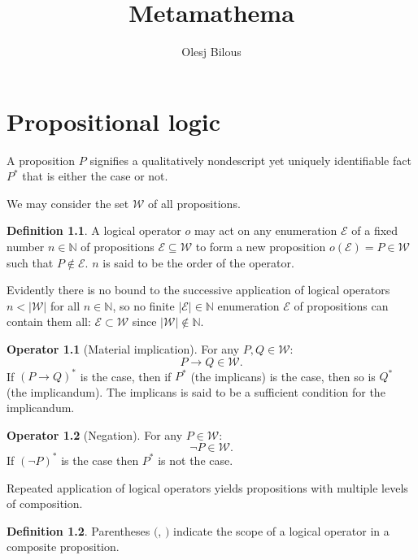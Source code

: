 \documentclass{amsbook}
\newcommand{\wffs}{\mathcal W}
\theoremstyle{definition}
\newtheorem{op}{Operator}[section]
\newtheorem{dfn}{Definition}[section]
\begin{document}
\title{Metamathema}
\author{Olesj Bilous}
\maketitle

\chapter{Propositional logic}

A proposition $P$ signifies a qualitatively nondescript yet uniquely identifiable fact $P^*$ that is either the case or not.

We may consider the set $\mathcal W$ of all propositions.

\begin{dfn}
    A logical operator $o$ may act on any enumeration $\mathcal E$ of a fixed number $n \in \mathbb N$ of propositions $\mathcal E \subseteq \mathcal W$ to form a new proposition $o(\mathcal E) = P \in \mathcal W$ such that $P \notin \mathcal E$. $n$ is said to be the order of the operator.
\end{dfn}

Evidently there is no bound to the successive application of logical operators $n < |\mathcal W|$ for all $n \in \mathbb N$, so no finite $|\mathcal E| \in \mathbb N$ enumeration $\mathcal E$ of propositions can contain them all: $\mathcal E \subset \mathcal W$ since $|\mathcal W| \notin \mathbb N$.

\begin{op}[Material implication]
    For any $P, Q \in \wffs$:
    $$
        P \rightarrow Q \in \wffs.
    $$
    If $(P \rightarrow Q)^*$ is the case, then if $P^*$ (the implicans) is the case, then so is $Q^*$ (the implicandum). The implicans is said to be a sufficient condition for the implicandum.
\end{op}

\begin{op}[Negation]
    For any $P \in \wffs$:
    $$
        \neg P \in \wffs.
    $$
    If $(\neg P)^*$ is the case then $P^*$ is not the case.
\end{op}

Repeated application of logical operators yields propositions with multiple levels of composition.

\begin{dfn}
    Parentheses $($, $)$ indicate the scope of a logical operator in a composite proposition.
\end{dfn}
\end{document}
